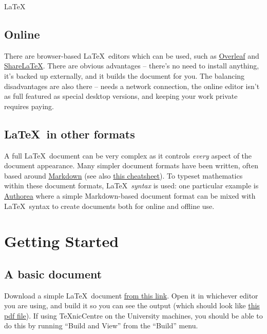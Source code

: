 \begin{chapter}{\LaTeX}
\subsection{Online}

There are browser-based \LaTeX\ editors which can be used, such as \href{https://www.overleaf.com/}{Overleaf} and \href{https://www.sharelatex.com/}{ShareLaTeX}. There are obvious advantages -- there's no need to install anything, it's backed up externally, and it builds the document for you. The balancing disadvantages are also there -- needs a network connection, the online editor isn't as full featured as special desktop versions, and keeping your work private requires paying.

\subsection{\LaTeX\ in other formats}

A full \LaTeX\ document can be very complex as it controls \emph{every} aspect of the document appearance. Many simpler document formats have been written, often based around \href{http://daringfireball.net/projects/markdown/}{Markdown} (see also \href{https://github.com/adam-p/markdown-here/wiki/Markdown-Cheatsheet}{this cheatsheet}). To typeset mathematics within these document formats, \LaTeX\ \emph{syntax} is used: one particular example is \href{https://www.authorea.com}{Authorea} where a simple Markdown-based document format can be mixed with \LaTeX\ syntax to create documents both for online and offline use.

\section{Getting Started}

\subsection{A basic document}

Download a simple \LaTeX\ document \href{https://raw.githubusercontent.com/IanHawke/maths-with-python/master/latex/BasicLatex.tex}{from this link}. Open it in whichever editor you are using, and build it so you can see the output (which should look like \href{https://github.com/IanHawke/maths-with-python/raw/master/latex/BasicLatex.pdf}{this pdf file}). If using TeXnicCentre on the University machines, you should be able to do this by running ``Build and View'' from the ``Build'' menu.


\end{chapter}
